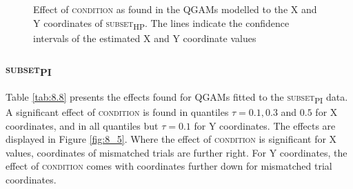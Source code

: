\begin{figure}
    \centering
    
    \caption{Effect of \textsc{condition} as found in the QGAMs modelled to the X and Y coordinates of \textsc{subset\textsubscript{HP}}. The lines indicate the confidence intervals of the estimated X and Y coordinate values}
    \label{fig:8_4}
\end{figure}

\subsubsection{\textsc{subset\textsubscript{PI}}}\label{section08_2_2_3}

Table \ref{tab:8.8} presents the effects found for QGAMs fitted to the \textsc{subset\textsubscript{PI}} data. A significant effect of \textsc{condition} is found in quantiles $\tau=0.1,0.3$ and $0.5$ for X coordinates, and in all quantiles but $\tau=0.1$ for Y coordinates. The effects are displayed in Figure \ref{fig:8_5}. Where the effect of \textsc{condition} is significant for X values, coordinates of mismatched trials are further right. For Y coordinates, the effect of \textsc{condition} comes with coordinates further down for mismatched trial coordinates.


